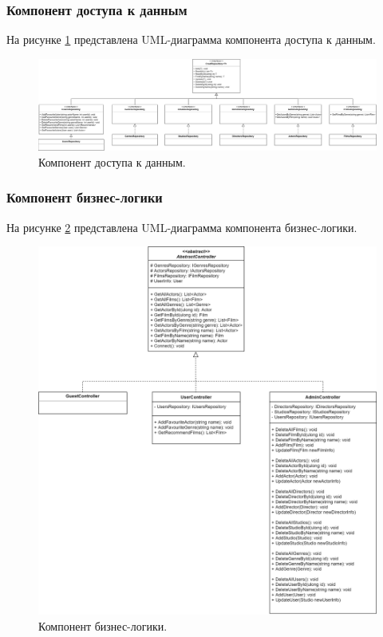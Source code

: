 \subsubsection{Компонент доступа к данным}
На рисунке \ref{img:AccessToDB} представлена UML-диаграмма компонента доступа к данным.
\begin{figure}[h!]
	\centering
	\includegraphics[scale=0.14]{img/AccessToDB.png}
	\caption{Компонент доступа к данным.}
	\label{img:AccessToDB}
\end{figure}
\newpage
\subsubsection{Компонент бизнес-логики}
На рисунке \ref{img:Controllers} представлена UML-диаграмма компонента бизнес-логики.
\begin{figure}[h!]
	\centering
	\includegraphics[scale=0.14]{img/Controllers.png}
	\caption{Компонент бизнес-логики.}
	\label{img:Controllers}
\end{figure}
